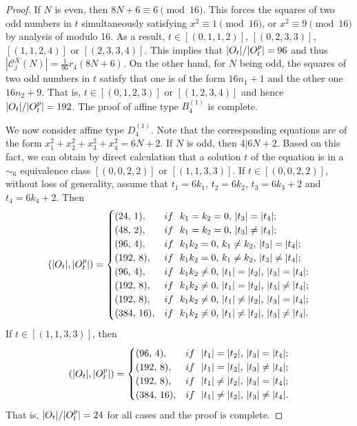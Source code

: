 \documentclass[10pt,a4paper]{amsart}
\begin{document}
\begin{proof}
If $N$ is even, then $8N+6\equiv 6 \pmod {16}$. This forces the squares of two odd numbers in $t$ simultaneously satisfying 
$x^2\equiv 1 \pmod{16}$, or $x^2\equiv 9 \pmod{16}$ by analysis of modulo 16. 
As a result, $t\in [(0, 1, 1, 2)]$, $[(0, 2, 3, 3)]$, $[(1, 1, 2, 4)]$ or $[(2, 3, 3, 4)]$.
This implies that $|{\rm O}_t|/ |{\rm O}_t^{\rm p}|=96$ and thus $|\mathcal{C}_j^X(N)|=\frac{1}{96}r_4(8N+6)$.
On the other hand, for $N$ being odd, the squares of two odd numbers in $t$ 
satisfy that one is of the form $16n_1+1$ and the other one $16n_2+9$.
That is, $t\in [(0, 1, 2, 3)]$ or $[(1, 2, 3, 4)]$ and hence $|{\rm O}_t|/ |{\rm O}_t^{\rm p}|=192$. 
The proof of affine type $B_4^{(1)}$ is complete.

We now consider affine type $D_4^{(1)}$. Note that the corresponding equations are of the form $x_1^2+x_2^2+x_3^2+x_4^2=6N+2$. 
If $N$ is odd, then $4|6N+2$. Based on this fact, we can obtain by direct calculation 
that a solution $t$ of the equation is in a $\sim_6$ equivalence class $[(0, 0, 2, 2)]$ or $[(1, 1, 3, 3)]$.
If $t\in [(0, 0, 2, 2)]$, without loss of generality, assume that $t_1=6k_1$, $t_2=6k_2$, $t_3=6k_3+2$ and $t_4=6k_4+2$. Then
$$(|{\rm O}_t|, |{\rm O}_t^{\rm p}|)=
\begin{cases}
	(24,\,1),  &  {\rm if }\,\, \text{ $k_1=k_2=0$, $|t_3|=|t_4|$}; \\
	(48,\,2),  & {\rm if }\,\, \text{ $k_1=k_2=0$, $|t_3|\neq|t_4|$};\\
	(96,\,4),  & {\rm if }\,\, \text{ $k_1k_2=0$, $k_1\neq k_2$, $|t_3|=|t_4|$};\\
    (192,\,8),  & {\rm if }\,\, \text{ $k_1k_2=0$, $k_1\neq k_2$, $|t_3|\neq|t_4|$};\\
	(96,\,4),  & {\rm if }\,\, \text{ $k_1k_2\neq0$, $|t_1|=|t_2|$, $|t_3|=|t_4|$}; \\
	(192,\,8),  & {\rm if }\,\, \text{ $k_1k_2\neq0$, $|t_1|=|t_2|$, $|t_3|\neq|t_4|$};\\
	(192,\,8),  & {\rm if }\,\, \text{ $k_1k_2\neq0$, $|t_1|\neq|t_2|$, $|t_3|=|t_4|$};\\
	(384,\,16),  & {\rm if }\,\, \text{ $k_1k_2\neq0$, $|t_1|\neq|t_2|$, $|t_3|\neq|t_4|$.}
\end{cases}
$$
If $t\in [(1, 1, 3, 3)]$, then
$$(|{\rm O}_t|, |{\rm O}_t^{\rm p}|)=
\begin{cases}
	(96,\,4),  & {\rm if }\,\, \text{ $|t_1|=|t_2|$, $|t_3|=|t_4|$}; \\
	(192,\,8),  & {\rm if }\,\, \text{ $|t_1|=|t_2|$, $|t_3|\neq|t_4|$};\\
	(192,\,8),  & {\rm if }\,\, \text{ $|t_1|\neq|t_2|$, $|t_3|=|t_4|$};\\
	(384,\,16),  & {\rm if }\,\, \text{ $|t_1|\neq|t_2|$, $|t_3|\neq|t_4|$.}
\end{cases}
$$
That is, $|{\rm O}_t|/|{\rm O}_t^{\rm p}|=24$ for all cases and the proof is complete.
\end{proof}
\end{document}
